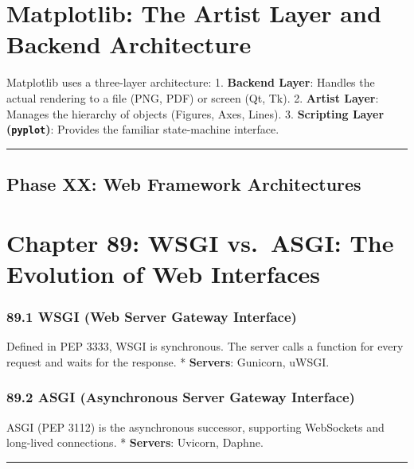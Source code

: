 \hypertarget{matplotlib-the-artist-layer-and-backend-architecture}{%
\chapter{Matplotlib: The Artist Layer and Backend
Architecture}\label{matplotlib-the-artist-layer-and-backend-architecture}}

Matplotlib uses a three-layer architecture: 1. \textbf{Backend Layer}:
Handles the actual rendering to a file (PNG, PDF) or screen (Qt, Tk). 2.
\textbf{Artist Layer}: Manages the hierarchy of objects (Figures, Axes,
Lines). 3. \textbf{Scripting Layer (\passthrough{\lstinline!pyplot!})}:
Provides the familiar state-machine interface.

\begin{center}\rule{0.5\linewidth}{0.5pt}\end{center}

\hypertarget{phase-xx-web-framework-architectures}{%
\section{Phase XX: Web Framework
Architectures}\label{phase-xx-web-framework-architectures}}

\hypertarget{chapter-89-wsgi-vs.-asgi-the-evolution-of-web-interfaces}{%
\chapter{Chapter 89: WSGI vs.~ASGI: The Evolution of Web
Interfaces}\label{chapter-89-wsgi-vs.-asgi-the-evolution-of-web-interfaces}}

\hypertarget{wsgi-web-server-gateway-interface}{%
\subsection{89.1 WSGI (Web Server Gateway
Interface)}\label{wsgi-web-server-gateway-interface}}

Defined in PEP 3333, WSGI is synchronous. The server calls a function
for every request and waits for the response. * \textbf{Servers}:
Gunicorn, uWSGI.

\hypertarget{asgi-asynchronous-server-gateway-interface}{%
\subsection{89.2 ASGI (Asynchronous Server Gateway
Interface)}\label{asgi-asynchronous-server-gateway-interface}}

ASGI (PEP 3112) is the asynchronous successor, supporting WebSockets and
long-lived connections. * \textbf{Servers}: Uvicorn, Daphne.

\begin{center}\rule{0.5\linewidth}{0.5pt}\end{center}
